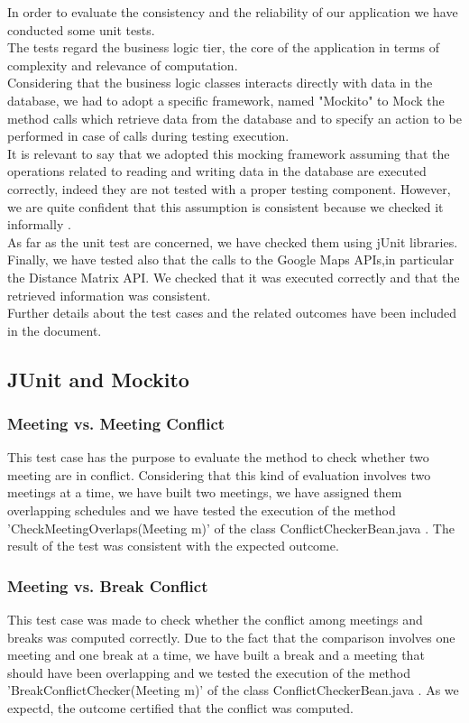 In order to evaluate the consistency and the reliability of our application we have conducted some unit tests. \\
The tests regard the business logic tier, the core of the application in terms of complexity and relevance of computation.\\
Considering that the business logic classes interacts directly with data in the database, we had to adopt a specific framework, named "Mockito" to Mock the method calls which retrieve data from the database and to specify an action to be performed in case of calls during testing execution.\\
It is relevant to say that we adopted this mocking framework assuming that the operations related to reading and writing data in the database are executed correctly, indeed they are not tested with a proper testing component. However, we are quite confident that this assumption is consistent because we checked it informally .\\
As far as the unit test are concerned, we have checked them using jUnit libraries.\\
Finally, we have tested also that the calls to the Google Maps APIs,in particular the Distance Matrix API. We checked that it was executed correctly and that the  retrieved information was consistent.\\ 
Further details about the test cases and the related outcomes have been included in the document.\\

\subsection{JUnit and Mockito}


\subsubsection{Meeting vs. Meeting Conflict}
This test case has the purpose to evaluate the method to check whether two meeting are in conflict. Considering that this kind of evaluation involves two meetings at a time, we have  built two meetings, we have assigned them overlapping schedules and we have tested the execution of the method 'CheckMeetingOverlaps(Meeting m)' of the class ConflictCheckerBean.java . The result of the test was consistent with the expected outcome. 

\subsubsection{Meeting vs. Break Conflict}
This test case was made to check whether the conflict among meetings and breaks was computed correctly. Due to the fact that the comparison involves one meeting and one break at a time, we have built a break and a meeting that should have been overlapping and we tested the execution of the method 'BreakConflictChecker(Meeting m)' of the class ConflictCheckerBean.java . As we expectd, the outcome certified that the conflict was computed. 

